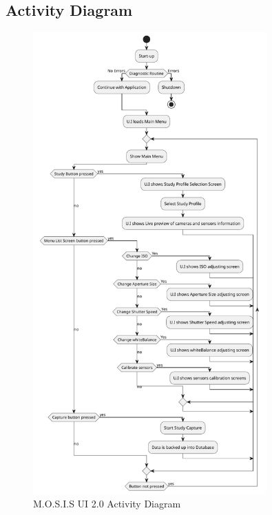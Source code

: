 \subsection{Activity Diagram}
\begin{figure}[H]
    \includegraphics[pages=1,width=0.8\textwidth]{../Appendix/Design_Documentation/Activity_Diagram/Figures/activity.pdf}
    \caption{M.O.S.I.S UI 2.0 Activity Diagram}
\end{figure}
